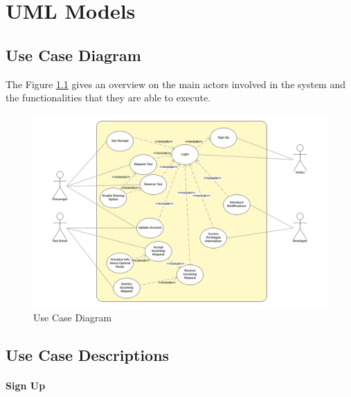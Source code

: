 \chapter{UML Models} \label{chap5}

\section{Use Case Diagram}
The Figure \ref{fig:usecase} gives an overview on the main actors involved in the system and the functionalities that they are able to execute.

\begin{figure}[htbp]
\centering
\includegraphics[width=\textwidth]{cpt/img/UseCase}
\caption{Use Case Diagram}
\label{fig:usecase}
\end{figure}

\section{Use Case Descriptions}

\subsubsection{Sign Up}


